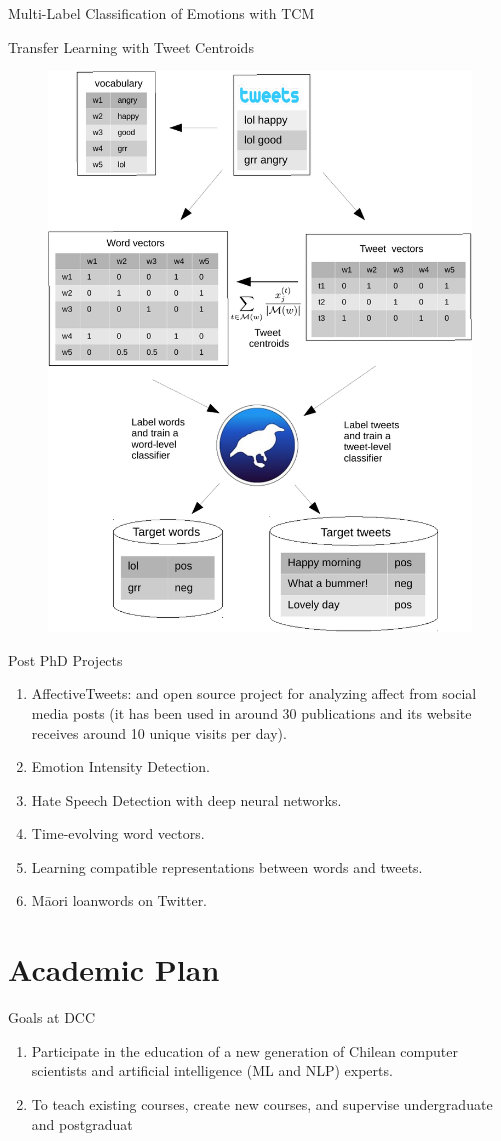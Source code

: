 \documentclass[handout]{beamer}
\begin{document}
\begin{frame}{Multi-Label Classification of Emotions with TCM}
\begin{scriptsize}

\begin{figure}[htbp]
\begin{center}
\end{center}
\end{figure}

\end{scriptsize}
\end{frame}

\begin{frame}{Transfer Learning with Tweet Centroids}

\begin{figure}[htb]
	\centering
	 \includegraphics[scale=0.4]{pics/tweetsToWords.pdf}
\end{figure}



\end{frame}









\begin{frame}{Post PhD Projects}

\begin{enumerate}
 \item AffectiveTweets: and open source project for analyzing affect from social media posts (it has been used in around 30 publications and its website receives around 10 unique visits per day).
 \item Emotion Intensity Detection.
 \item Hate Speech Detection with deep neural networks.
 \item Time-evolving word vectors.
 \item Learning compatible representations between words and tweets.
 \item M\={a}ori loanwords on Twitter.
 \end{enumerate}

\end{frame}





\section{Academic Plan}


\begin{frame}{Goals at DCC}
\begin{scriptsize}
  \begin{enumerate}
\item Participate in the education of a new generation of Chilean computer scientists and artificial intelligence (ML and NLP) experts.
\item To teach existing courses, create new courses, and supervise undergraduate and postgraduat
\end{enumerate}
\end{scriptsize}
\end{frame}
\end{document}
